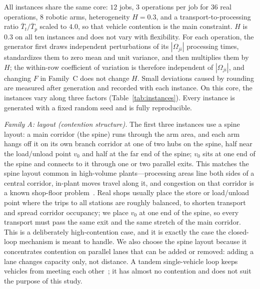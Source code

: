 \documentclass[manuscript,screen,review]{acmart}
\begin{document}
All instances share the same core: $12$ jobs, $3$ operations per job for $36$ real operations, $8$ robotic arms,
heterogeneity $H=0.3$, and a transport-to-processing ratio $\bar{T}_t/\bar{T}_p$ scaled to $4.0$, so that vehicle contention is the main constraint.
$H$ is $0.3$ on all ten instances and does not vary with flexibility.
For each operation, the generator first draws independent perturbations of its $|\Omega_{ji}|$ processing times, standardizes them to zero mean and unit variance, and then multiplies them by $H$; the within-row coefficient of variation is therefore independent of $|\Omega_{ji}|$, and changing $F$ in Family~C does not change $H$.
Small deviations caused by rounding are measured after generation and recorded with each instance.
On this core, the instances vary along three factors (Table~\ref{tab:instances}).
Every instance is generated with a fixed random seed and is fully reproducible.

\emph{Family A: layout (contention structure).}
The first three instances use a spine layout: a main corridor (the spine) runs through the arm area, and each arm hangs off it on its own branch corridor at one of two hubs on the spine, half near the load/unload point $v_0$ and half at the far end of the spine; $v_0$ sits at one end of the spine and connects to it through one or two parallel exits.
This matches the spine layout common in high-volume plants---processing areas line both sides of a central corridor, in-plant moves travel along it, and congestion on that corridor is a known shop-floor problem~\cite{suh2022spine}.
Real shops usually place the store or load/unload point where the trips to all stations are roughly balanced, to shorten transport and spread corridor occupancy; we place $v_0$ at one end of the spine, so every transport must pass the same exit and the same stretch of the main corridor. This is a deliberately high-contention case, and it is exactly the case the closed-loop mechanism is meant to handle.
We also choose the spine layout because it concentrates contention on parallel lanes that can be added or removed: adding a lane changes capacity only, not distance. A tandem single-vehicle loop keeps vehicles from meeting each other~\cite{rahimikelarijani2020tandem}; it has almost no contention and does not suit the purpose of this study.
\end{document}
